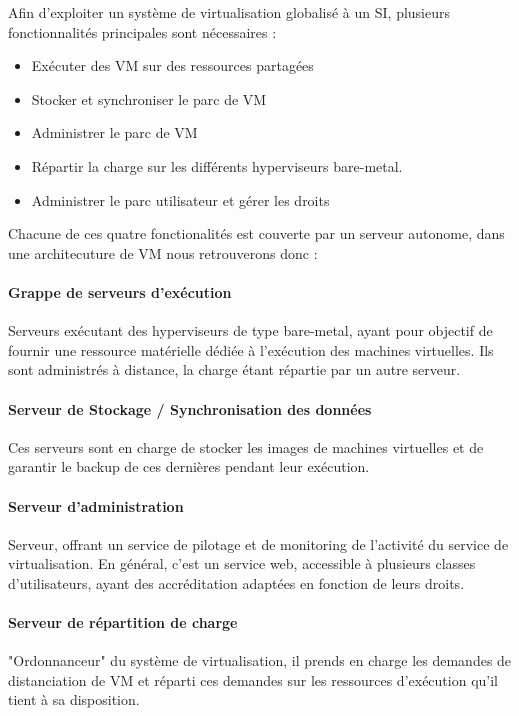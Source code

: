 Afin d'exploiter un système de virtualisation globalisé à un SI, plusieurs fonctionnalités principales sont nécessaires :\\
\begin{itemize}
\item Exécuter des VM sur des ressources partagées
\item Stocker et synchroniser le parc de VM
\item Administrer le parc de VM
\item Répartir la charge sur les différents hyperviseurs bare-metal.
\item Administrer le parc utilisateur et gérer les droits\\
\end{itemize} 

Chacune de ces quatre fonctionalités est couverte par un serveur autonome, dans une architecuture de VM nous retrouverons donc :\\

\paragraph{Grappe de serveurs d'exécution} Serveurs exécutant des hyperviseurs de type bare-metal,  ayant pour objectif de fournir une ressource matérielle dédiée à l'exécution des machines virtuelles. Ils sont administrés à distance, la charge étant répartie par un autre serveur. 

\paragraph{Serveur de Stockage / Synchronisation des données} Ces serveurs sont en charge de stocker les images de machines virtuelles et de garantir le backup de ces dernières pendant leur exécution.

\paragraph{Serveur d'administration} Serveur, offrant un service de pilotage et de monitoring de l'activité du service de virtualisation. En général, c'est un service web, accessible à plusieurs classes d'utilisateurs, ayant des accréditation adaptées en fonction de leurs droits.

\paragraph{Serveur de répartition de charge}
"Ordonnanceur" du système de virtualisation, il prends en charge les demandes de distanciation de VM et réparti ces demandes sur les ressources d'exécution qu'il tient à sa disposition.

